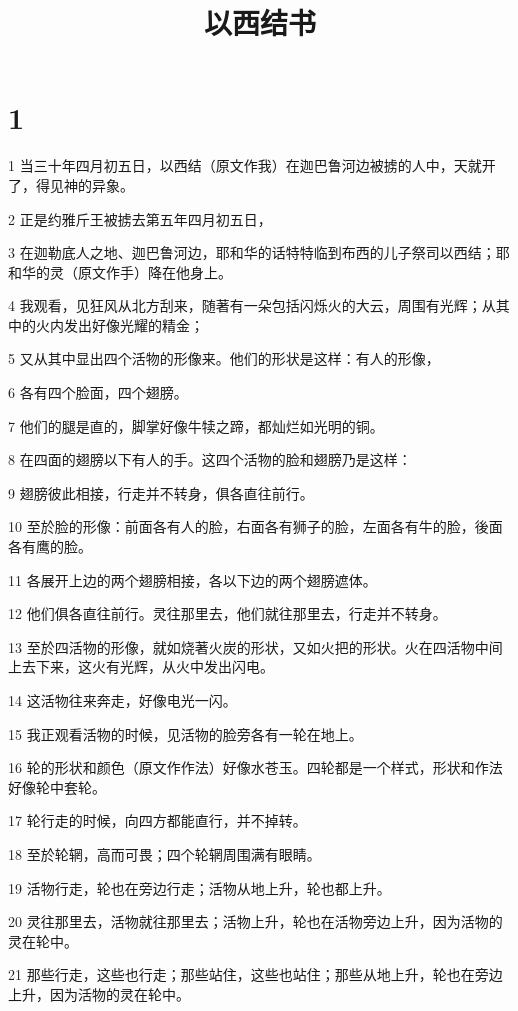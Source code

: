 

\title{以西结书}


\chapter{1}

\par 1 当三十年四月初五日，以西结（原文作我）在迦巴鲁河边被掳的人中，天就开了，得见神的异象。
\par 2 正是约雅斤王被掳去第五年四月初五日，
\par 3 在迦勒底人之地、迦巴鲁河边，耶和华的话特特临到布西的儿子祭司以西结；耶和华的灵（原文作手）降在他身上。
\par 4 我观看，见狂风从北方刮来，随著有一朵包括闪烁火的大云，周围有光辉；从其中的火内发出好像光耀的精金；
\par 5 又从其中显出四个活物的形像来。他们的形状是这样：有人的形像，
\par 6 各有四个脸面，四个翅膀。
\par 7 他们的腿是直的，脚掌好像牛犊之蹄，都灿烂如光明的铜。
\par 8 在四面的翅膀以下有人的手。这四个活物的脸和翅膀乃是这样：
\par 9 翅膀彼此相接，行走并不转身，俱各直往前行。
\par 10 至於脸的形像：前面各有人的脸，右面各有狮子的脸，左面各有牛的脸，後面各有鹰的脸。
\par 11 各展开上边的两个翅膀相接，各以下边的两个翅膀遮体。
\par 12 他们俱各直往前行。灵往那里去，他们就往那里去，行走并不转身。
\par 13 至於四活物的形像，就如烧著火炭的形状，又如火把的形状。火在四活物中间上去下来，这火有光辉，从火中发出闪电。
\par 14 这活物往来奔走，好像电光一闪。
\par 15 我正观看活物的时候，见活物的脸旁各有一轮在地上。
\par 16 轮的形状和颜色（原文作作法）好像水苍玉。四轮都是一个样式，形状和作法好像轮中套轮。
\par 17 轮行走的时候，向四方都能直行，并不掉转。
\par 18 至於轮辋，高而可畏；四个轮辋周围满有眼睛。
\par 19 活物行走，轮也在旁边行走；活物从地上升，轮也都上升。
\par 20 灵往那里去，活物就往那里去；活物上升，轮也在活物旁边上升，因为活物的灵在轮中。
\par 21 那些行走，这些也行走；那些站住，这些也站住；那些从地上升，轮也在旁边上升，因为活物的灵在轮中。
